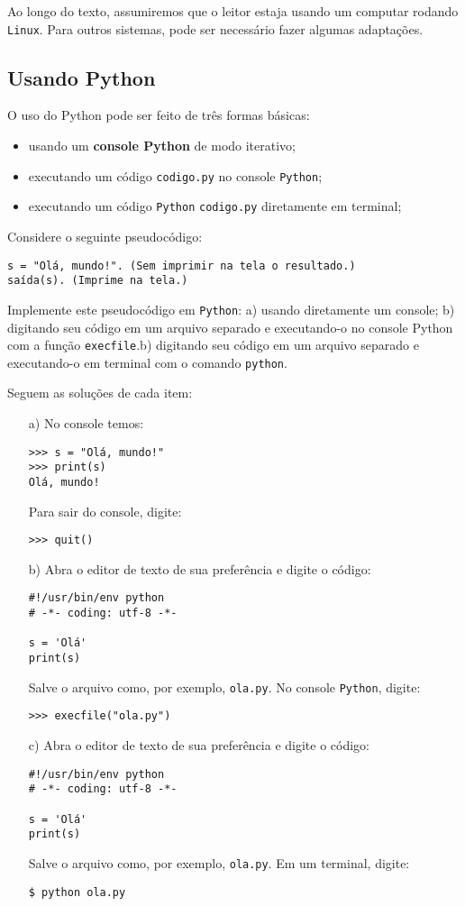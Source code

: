 Ao longo do texto, assumiremos que o leitor estaja usando um computar rodando \verb+Linux+. Para outros sistemas, pode ser necessário fazer algumas adaptações.

\subsection{Usando Python}

O uso do Python pode ser feito de três formas básicas:
\begin{itemize}
\item usando um {\bf console Python} de modo iterativo;
\item executando um código \verb+codigo.py+ no console \verb+Python+;
\item executando um código \verb+Python+ \verb+codigo.py+ diretamente em terminal;
\end{itemize}

\begin{ex}
  Considere o seguinte pseudocódigo:
\begin{verbatim}
s = "Olá, mundo!". (Sem imprimir na tela o resultado.)
saída(s). (Imprime na tela.)
\end{verbatim}
Implemente este pseudocódigo em \verb+Python+: a) usando diretamente um console; b) digitando seu código em um arquivo separado e executando-o no console Python com a função \verb+execfile+.b) digitando seu código em um arquivo separado e executando-o em terminal com o comando \verb+python+.
\end{ex}
\begin{sol} Seguem as soluções de cada item:
  \begin{itemize}
  \item[a)]  No console temos:
\begin{verbatim}
>>> s = "Olá, mundo!"
>>> print(s)
Olá, mundo!
\end{verbatim}
Para sair do console, digite:
\begin{verbatim}
>>> quit()
\end{verbatim}
  \item[b)] Abra o editor de texto de sua preferência e digite o código:
\begin{verbatim}
#!/usr/bin/env python
# -*- coding: utf-8 -*-

s = 'Olá'
print(s)
\end{verbatim}
Salve o arquivo como, por exemplo, \verb+ola.py+. No console \verb+Python+, digite:
\begin{verbatim}
>>> execfile("ola.py")
\end{verbatim}
  \item[c)] Abra o editor de texto de sua preferência e digite o código:
\begin{verbatim}
#!/usr/bin/env python
# -*- coding: utf-8 -*-

s = 'Olá'
print(s)
\end{verbatim}
Salve o arquivo como, por exemplo, \verb+ola.py+. Em um terminal, digite:
\begin{verbatim}
$ python ola.py
\end{verbatim}
\end{itemize}
\end{sol}

